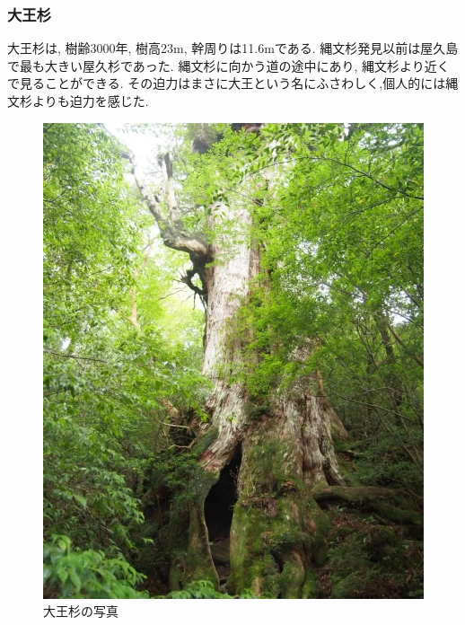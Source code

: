 \documentclass[10pt,titlepage,a5paper]{ltjsbook}
\begin{document}
  \begin{minipage}{0.58\columnwidth}
    \subsubsection*{大王杉}
      大王杉は, 樹齢3000年, 樹高23m, 幹周りは11.6mである. 縄文杉発見以前は屋久島で最も大きい屋久杉であった. 縄文杉に向かう道の途中にあり, 縄文杉より近くで見ることができる. その迫力はまさに大王という名にふさわしく,個人的には縄文杉よりも迫力を感じた.
  \end{minipage}
  \hfill
  \begin{minipage}{0.38\columnwidth}
    \begin{figure}[H]
          \centering
          \includegraphics[width=\columnwidth]{daioh.jpg}
          \caption{大王杉の写真}
          \label{fig:daioh_photo}
      \end{figure}
  \end{minipage}
\end{document}
